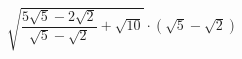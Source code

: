\begin{ex}[type=calculate]
	\begin{condition}
		\( \sqrt{\dfrac{5\sqrt{5}-2\sqrt{2}}{\sqrt{5}-\sqrt{2}}+\sqrt{10}}\cdot(\sqrt{5}-\sqrt{2}) \)
	\end{condition}
\end{ex}